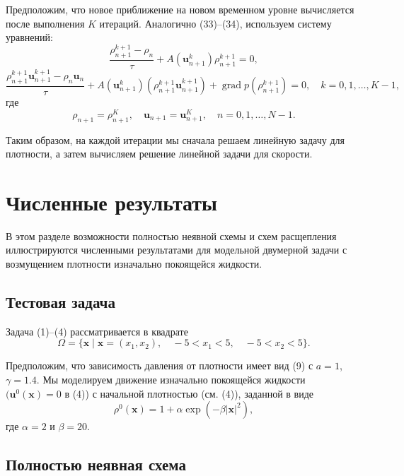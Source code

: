 \documentclass[10pt,twocolumn]{article}
\begin{document}
Предположим, что новое приближение на новом временном уровне вычисляется после выполнения \(K\) итераций. Аналогично (33)--(34), используем систему уравнений:
\begin{equation}
\frac{\rho_{n + 1}^{k + 1} - \rho_n}{\tau} +A(\mathbf{u}_{n + 1}^{k})\rho_{n + 1}^{k + 1} = 0, \tag{36}
\end{equation}
\begin{equation}
\frac{\rho_{n + 1}^{k + 1}\mathbf{u}_{n + 1}^{k + 1} - \rho_n\mathbf{u}_n}{\tau} +A(\mathbf{u}_{n + 1}^{k})(\rho_{n + 1}^{k + 1}\mathbf{u}_{n + 1}^{k + 1}) + \operatorname{grad}p(\rho_{n + 1}^{k + 1}) = 0, \quad k = 0,1,\ldots ,K - 1, \tag{37}
\end{equation}
где
\begin{equation}
\rho_{n + 1} = \rho_{n + 1}^{K},\quad \mathbf{u}_{n + 1} = \mathbf{u}_{n + 1}^{K},\quad n = 0,1,\ldots ,N - 1. \tag{38}
\end{equation}

Таким образом, на каждой итерации мы сначала решаем линейную задачу для плотности, а затем вычисляем решение линейной задачи для скорости.

\section{Численные результаты}

В этом разделе возможности полностью неявной схемы и схем расщепления иллюстрируются численными результатами для модельной двумерной задачи с возмущением плотности изначально покоящейся жидкости.

\subsection{Тестовая задача}

Задача (1)–(4) рассматривается в квадрате
\[
\Omega = \{\mathbf {x}\mid \mathbf {x} = (x_1,x_2),\quad -5 < x_1 < 5,\quad -5 < x_2 < 5\}.
\]

Предположим, что зависимость давления от плотности имеет вид (9) с \(a = 1\), \(\gamma = 1.4\). Мы моделируем движение изначально покоящейся жидкости \((\mathbf {u}^0 (\mathbf {x}) = 0\) в (4)) с начальной плотностью (см. (4)), заданной в виде
\[
\rho^0 (\mathbf {x}) = 1 + \alpha \exp (-\beta |\mathbf {x}|^2),
\]
где \(\alpha = 2\) и \(\beta = 20\).

\subsection{Полностью неявная схема}
\end{document}
